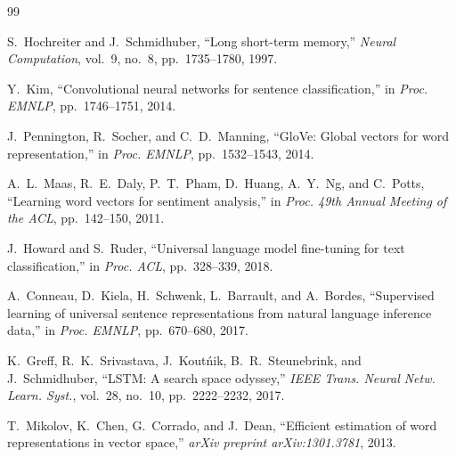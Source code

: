 \documentclass[letterpaper, 10pt, conference]{ieeeconf}
\begin{document}
\begin{thebibliography}{99}

S.~Hochreiter and J.~Schmidhuber,
``Long short-term memory,''
\textit{Neural Computation}, vol.~9, no.~8, pp.~1735--1780, 1997.

Y.~Kim,
``Convolutional neural networks for sentence classification,''
in \textit{Proc. EMNLP}, pp.~1746--1751, 2014.

J.~Pennington, R.~Socher, and C.~D.~Manning,
``GloVe: Global vectors for word representation,''
in \textit{Proc. EMNLP}, pp.~1532--1543, 2014.

A.~L.~Maas, R.~E.~Daly, P.~T.~Pham, D.~Huang, A.~Y.~Ng, and C.~Potts,
``Learning word vectors for sentiment analysis,''
in \textit{Proc. 49th Annual Meeting of the ACL}, pp.~142--150, 2011.

J.~Howard and S.~Ruder,
``Universal language model fine-tuning for text classification,''
in \textit{Proc. ACL}, pp.~328--339, 2018.

A.~Conneau, D.~Kiela, H.~Schwenk, L.~Barrault, and A.~Bordes,
``Supervised learning of universal sentence representations from natural
language inference data,''
in \textit{Proc. EMNLP}, pp.~670--680, 2017.

K.~Greff, R.~K.~Srivastava, J.~Kout\'nik, B.~R.~Steunebrink, and J.~Schmidhuber,
``LSTM: A search space odyssey,''
\textit{IEEE Trans. Neural Netw. Learn. Syst.}, vol.~28, no.~10,
pp.~2222--2232, 2017.

T.~Mikolov, K.~Chen, G.~Corrado, and J.~Dean,
``Efficient estimation of word representations in vector space,''
\textit{arXiv preprint arXiv:1301.3781}, 2013.

\end{thebibliography}
\end{document}
